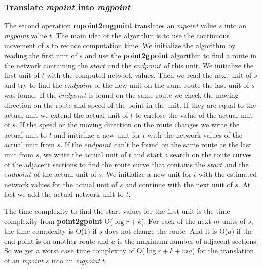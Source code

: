 \documentclass[a4paper]{article}
\newcommand{\op}[1]{\textbf{#1}}
\newcommand{\dt}[1]{\textsl{\underline{#1}}}
\begin{document}
\subsubsection{Translate \dt{mpoint} into \dt{mgpoint}}
The second operation \op{mpoint2mgpoint} translates an \dt{mpoint} value $s$
into an \dt{mgpoint} value $t$. The main idea of the algorithm is to use the
continuous movement of $s$ to reduce computation time. We initialize the
algorithm by reading the first unit of $s$ and use the \op{point2gpoint}
algorithm to find a route in the network containing the $start$ and
the $end point$ of this unit. We initialize the first unit of $t$ with
the computed network values. Then we read the next unit of $s$ and try to find
the $end point$ of the new unit on the same route the last unit of $s$ was
found. If the $end point$ is found on the same route we check the moving direction
on the route and speed of the point in the unit. If they are equal to the actual unit we extend
the actual unit of $t$ to enclose the value of the actual unit of $s$. If the
speed or the moving direction on the route changes we write the actual unit to $t$ and initialize
a new unit for $t$ with the network values of the actual unit from $s$.
If the $end point$ can't be found on the same route as the last unit from
$s$, we write the actual unit of $t$ and start a search on the route curves
of the adjacent sections to find the route curve that contains the $start$
and the $end point$ of the actual unit of $s$. We initialize a new unit
for $t$ with the estimated network values for the actual unit of $s$ and
continue with the next unit of $s$. At last we add the actual network unit
to $t$.

The time complexity to find the start values for the first unit is the time complexity
from \op{point2gpoint} O($\log r + k$).
For each of the next $m$ units of $s$, the time complexity is O(1) if $s$ does not
change the route. And it is O($a$) if the end point is on another route and $a$ is the maximum
number of adjacent sections. So we get a worst case time complexity of
O($\log r + k + ma$) for the translation of an \dt{mpoint} $s$ into an \dt{mgpoint} $t$.
\end{document}
